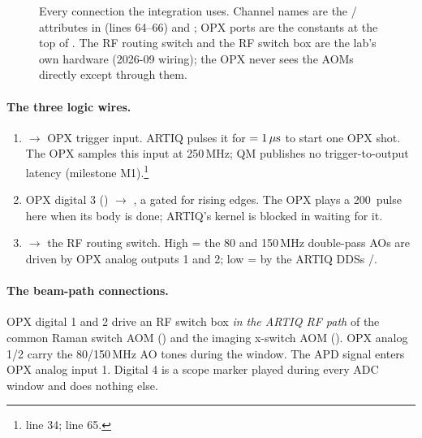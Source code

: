 \begin{figure}[htbp]
\caption{Every connection the integration uses. Channel names are the
/ attributes in
 (lines 64--66) and
; OPX ports are the constants at the top of
. The RF routing switch and the
RF switch box are the lab's own hardware (2026-09 wiring); the OPX never
sees the AOMs directly except through them.}
\label{fig:wires}
\end{figure}

\paragraph{The three logic wires.}
\begin{enumerate}[nosep]
  \item {} $\to$ OPX trigger input. ARTIQ pulses it for
     $= 1\,\mu\mathrm{s}$ to start one OPX shot. The OPX
    samples this input at 250\,MHz; QM publishes no trigger-to-output
    latency (milestone M1).\footnote{
    line 34;  line 65.}
  \item OPX digital 3 () $\to$ , a
     gated for rising edges. The OPX plays a 200\nsu\ pulse
    here when its body is done; ARTIQ's kernel is blocked in
     waiting for it.
  \item {} $\to$ the RF routing switch. High = the 80 and
    150\,MHz double-pass AOs are driven by OPX analog outputs 1 and 2; low =
    by the ARTIQ DDSs /.
\end{enumerate}

\paragraph{The beam-path connections.} OPX digital 1 and 2 drive an RF
switch box \emph{in the ARTIQ RF path} of the common Raman switch AOM
() and the imaging x-switch AOM ().
OPX analog 1/2 carry the 80/150\,MHz AO tones during the window. The APD
signal enters OPX analog input 1. Digital 4 is a scope marker played during
every ADC window and does nothing else.

